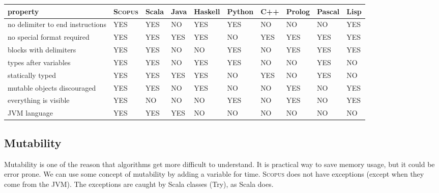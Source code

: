 \documentclass[12pt,a4paper]{article}
\newcommand{\Scopus}{\textsc{Scopus}\xspace}
\newcommand{\like}{{\color{green}YES}}
\newcommand{\unlike}{{\color{red}NO}}
\begin{document}
    {\tiny{
    \begin{center}
        \begin{tabular}{llllllllll}
            property                         & \Scopus & Scala   & Java    & Haskell & Python  & C++     & Prolog  & Pascal  & Lisp    \\
            \hline
            no delimiter to end instructions & \like   & \like   & \unlike & \like   & \like   & \unlike & \unlike & \unlike & \like   \\
            no special format required       & \like   & \like   & \like   & \like   & \unlike & \like   & \like   & \like   & \like   \\
            blocks with delimiters           & \like   & \like   & \unlike & \unlike & \like   & \unlike & \like   & \like   & \like   \\
            types after variables            & \like   & \like   & \unlike & \like   & \like   & \unlike & \unlike & \like   & \unlike \\
            statically typed                 & \like   & \like   & \like   & \like   & \unlike & \like   & \unlike & \like   & \unlike \\
            mutable objects discouraged      & \like   & \like   & \unlike & \like   & \unlike & \unlike & \like   & \unlike & \like   \\
            everything is visible            & \like   & \unlike & \unlike & \unlike & \like   & \unlike & \like   & \unlike & \like   \\
            JVM language                     & \like   & \like   & \like   & \unlike & \unlike & \unlike & \unlike & \unlike & \unlike \\
            \hline
        \end{tabular}
    \end{center}
    }}

    \subsection{Mutability}

    Mutability is one of the reason that algorithms get more difficult to understand.
    It is practical way to save memory usage, but it could be error prone.
    We can use some concept of mutability by adding a variable for time.
    \Scopus does not have exceptions (except when they come from the JVM).
    The exceptions are caught by Scala classes (Try), as Scala does.
\end{document}
